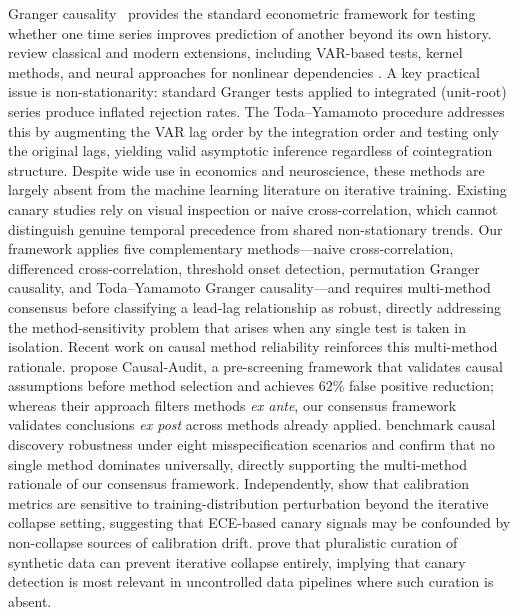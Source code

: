 Granger causality~\cite{granger1969investigating} provides the standard econometric framework for testing whether one time series improves prediction of another beyond its own history.
\citet{shojaie2022granger} review classical and modern extensions, including VAR-based tests, kernel methods, and neural approaches for nonlinear dependencies \cite{marcinkevics2022neural}.
A key practical issue is non-stationarity: standard Granger tests applied to integrated (unit-root) series produce inflated rejection rates.
The Toda--Yamamoto procedure addresses this by augmenting the VAR lag order by the integration order and testing only the original lags, yielding valid asymptotic inference regardless of cointegration structure.
Despite wide use in economics and neuroscience, these methods are largely absent from the machine learning literature on iterative training.
Existing canary studies rely on visual inspection or naive cross-correlation, which cannot distinguish genuine temporal precedence from shared non-stationary trends.
Our framework applies five complementary methods---naive cross-correlation, differenced cross-correlation, threshold onset detection, permutation Granger causality, and Toda--Yamamoto Granger causality---and requires multi-method consensus before classifying a lead-lag relationship as robust, directly addressing the method-sensitivity problem that arises when any single test is taken in isolation.
Recent work on causal method reliability reinforces this multi-method rationale.
\citet{ruiz2026causalaudit} propose Causal-Audit, a pre-screening framework that validates causal assumptions before method selection and achieves 62\% false positive reduction; whereas their approach filters methods \emph{ex ante}, our consensus framework validates conclusions \emph{ex post} across methods already applied.
\citet{yi2026causalcompass} benchmark causal discovery robustness under eight misspecification scenarios and confirm that no single method dominates universally, directly supporting the multi-method rationale of our consensus framework.
Independently, \citet{sahoo2026calibration} show that calibration metrics are sensitive to training-distribution perturbation beyond the iterative collapse setting, suggesting that ECE-based canary signals may be confounded by non-collapse sources of calibration drift.
\citet{falahati2026curated} prove that pluralistic curation of synthetic data can prevent iterative collapse entirely, implying that canary detection is most relevant in uncontrolled data pipelines where such curation is absent.